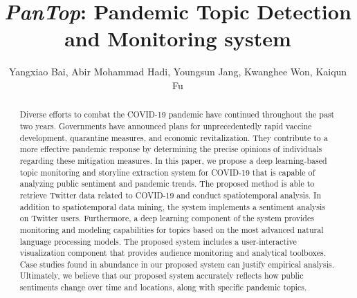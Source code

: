 \documentclass[sigconf, review]{acmart}
\begin{document}
\title{{\it PanTop}: Pandemic Topic Detection and Monitoring system}


\author{Yangxiao Bai, Abir Mohammad Hadi, Youngsun Jang, Kwanghee Won, Kaiqun Fu}

\begin{abstract} 
Diverse efforts to combat the COVID-19 pandemic have continued throughout the
past two years. Governments have announced plans for unprecedentedly rapid
vaccine development, quarantine measures, and economic revitalization. They
contribute to a more effective pandemic response by determining the precise
opinions of individuals regarding these mitigation measures. In this paper,
we propose a deep learning-based topic monitoring and storyline extraction
system for COVID-19 that is capable of analyzing public sentiment and
pandemic trends. The proposed method is able to retrieve Twitter data related
to COVID-19 and conduct spatiotemporal analysis. In addition to
spatiotemporal data mining, the system implements a sentiment analysis on
Twitter users. Furthermore, a deep learning component of the system provides
monitoring and modeling capabilities for topics based on the most advanced
natural language processing models. The proposed system includes a
user-interactive visualization component that provides audience monitoring
and analytical toolboxes. Case studies found in abundance in our proposed
system can justify empirical analysis. Ultimately, we believe that our
proposed system accurately reflects how public sentiments change over time
and locations, along with specific pandemic topics. 
\end{abstract}


\maketitle


% 







\end{document}
